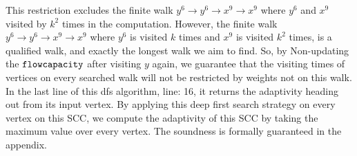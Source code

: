    This restriction excludes the finite walk $y^6 \to y^6 \to x^9 \to x^9$ where $y^6$ and $x^9$ visited by $k^2$ times
   in the computation. 
   However, the finite walk $y^6 \to y^6 \to x^9 \to x^9$ where $y^6$ is visited $k$ times and $x^9$ is visited $k^2$ times, is 
   a qualified walk, and exactly the longest walk we aim to find. So, by Non-updating the $\mathtt{flowcapacity}$ after 
   visiting $y$ again, we guarantee that the visiting times of vertices on every searched walk will not be restricted by weights not on this walk.
 In the last line of this dfs algorithm, line: 16, it returns the adaptivity heading out from its input vertex.
 By applying this deep first search strategy on every vertex on this SCC, 
 we compute the adaptivity of this SCC by taking the maximum 
 value over every vertex.
 The soundness is formally guaranteed 
 in the appendix.